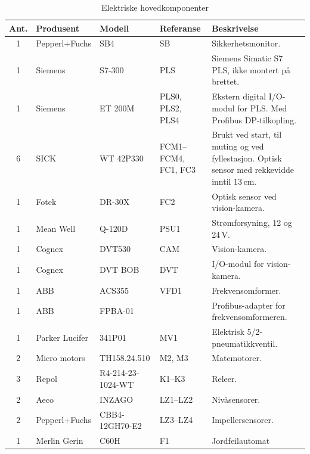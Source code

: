 \documentclass[Visionprosjekt.tex]{subfiles}
\begin{document}
\begin{table}[ht]%
    \centering
    \caption{Elektriske hovedkomponenter}    
    \renewcommand\arraystretch{1.2}
    \footnotesize
    \begin{tabularx}{\textwidth}{cll>{\raggedright\arraybackslash}p{22mm}>{\raggedright\arraybackslash}X}
        \toprule
        Ant. & Produsent	& Modell  & Referanse & Beskrivelse\\
        \midrule
        1 &  Pepperl+Fuchs  & SB4   & SB      & Sikkerhetsmonitor.\\
        1 & Siemens & S7-300        & PLS     &  Siemens Simatic S7 PLS, ikke montert på brettet.\\
        1 & Siemens & ET 200M       & PLS0, PLS2, PLS4         & Ekstern digital I/O-modul for PLS. Med Profibus DP-tilkopling.\\
        6 &   SICK  & WT 42P330     & FCM1--FCM4, \newline FC1, FC3 &  Brukt ved start, til muting og ved fyllestasjon. 
        Optisk sensor  med rekkevidde inntil 13\,cm.\\
        1 & Fotek   &  DR-30X       & FC2  	& Optisk sensor ved vision-kamera.\\
        1 & Mean Well & Q-120D      & PSU1    & Strømforsyning, 12 og 24\,V. \\
        1 & Cognex  & DVT530      & CAM     & Vision-kamera.\\
        1 & Cognex  & DVT BOB     & DVT     & I/O-modul for vision-kamera.\\
        1 &  ABB    & ACS355      & VFD1    & Frekvensomformer.\\
        1 &  ABB    & FPBA-01     &         & Profibus-adapter for frekvensomformeren.\\
        1 & Parker Lucifer & 341P01   & MV1  	& Elektrisk 5/2-pneumatikkventil.\\
        2 & Micro motors & TH158.24.510& M2, M3 	& Matemotorer.\\
        3 & Repol   & R4-214-23-1024-WT   & K1--K3 	& Releer.\\
        2 & Aeco    & INZAGO        & LZ1--LZ2	& Nivåsensorer.\\
        2 &  Pepperl+Fuchs          & CBB4-12GH70-E2   & LZ3--LZ4	& Impellersensorer.\\
        1 & Merlin Gerin & C60H     & F1	& Jordfeilautomat \\
        \bottomrule
	\end{tabularx}
    \label{tab:elliste}
\end{table}
\end{document}
